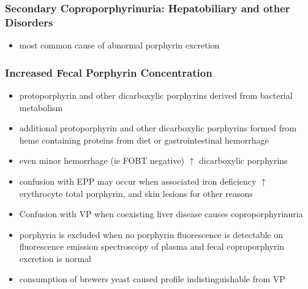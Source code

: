 \documentclass{scrartcl}
\begin{document}
\subsubsection{Secondary Coproporphyrinuria: Hepatobiliary and other Disorders}
\label{sec:orgad307b3}
\begin{itemize}
\item most common cause of abnormal porphyrin excretion
\end{itemize}

\subsubsection{Increased Fecal Porphyrin Concentration}
\label{sec:orgbac8daa}
\begin{itemize}
\item protoporphyrin and other dicarboxylic porphyrins derived from
bacterial metabolism
\item additional protoporphyrin and other dicarboxylic porphyrins formed
from heme containing proteins from diet or gastrointestinal
hemorrhage
\item even minor hemorrhage (ie FOBT negative) \(\uparrow\) dicarboxylic porphyrins
\item confusion with EPP may occur when associated iron deficiency
\(\uparrow\) erythrocyte total porphyrin, and skin lesions for other reasons
\item Confusion with VP when coexisting liver disease causes
coproporphyrinuria
\item porphyria is excluded when no porphyrin fluorescence is detectable
on fluorescence emission spectroscopy of plasma and fecal
coproporphyrin excretion is normal
\item consumption of brewers yeast caused profile indistinguishable from
VP
\end{itemize}
\end{document}

